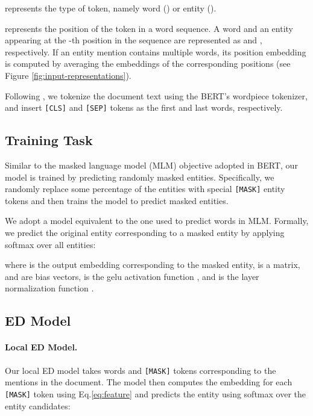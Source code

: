 \documentclass[11pt]{article}
\begin{document}
\vspace{1mm}
 represents the type of token, namely word () or entity ().

\vspace{1mm}
 represents the position of the token in a word sequence.
A word and an entity appearing at the -th position in the sequence are represented as  and , respectively.
If an entity mention contains multiple words, its position embedding is computed by averaging the embeddings of the corresponding positions (see Figure \ref{fig:input-representations}).

Following , we tokenize the document text using the BERT's wordpiece tokenizer, and insert \texttt{[CLS]} and \texttt{[SEP]} tokens as the first and last words, respectively.

\subsection{Training Task}
\label{subsec:mep}

Similar to the masked language model (MLM) objective adopted in BERT, our model is trained by predicting randomly masked entities.
Specifically, we randomly replace some percentage of the entities with special \texttt{[MASK]} entity tokens and then trains the model to predict masked entities.

We adopt a model equivalent to the one used to predict words in MLM.
Formally, we predict the original entity corresponding to a masked entity by applying softmax over all entities:

where  is the output embedding corresponding to the masked entity,  is a matrix,  and  are bias vectors,  is the gelu activation function \cite{hendrycks2016gaussian}, and  is the layer normalization function \cite{lei2016layer}.

\subsection{ED Model}

\paragraph{Local ED Model.}

Our local ED model takes words and  \texttt{[MASK]} tokens corresponding to the mentions in the document.
The model then computes the embedding  for each \texttt{[MASK]} token using Eq.\eqref{eq:feature} and predicts the entity using softmax over the  entity candidates:
\end{document}
